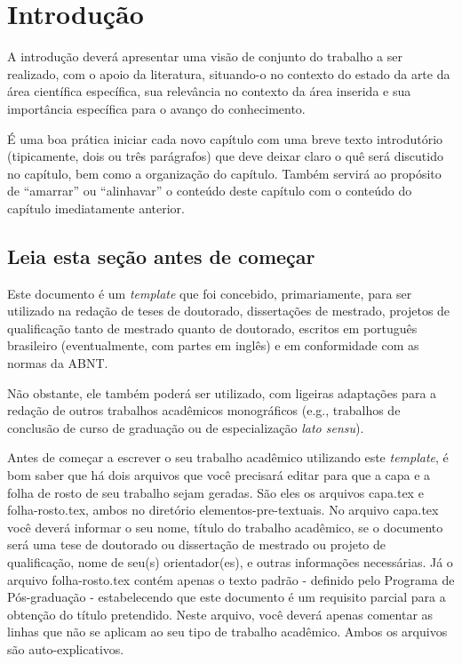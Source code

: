 
\chapter{Introdução}
\label{chap_introducao}

A introdução deverá apresentar uma visão de conjunto do trabalho a ser realizado, com o apoio da literatura, situando-o no contexto do estado da arte da área científica específica, sua relevância no contexto da área inserida e sua importância específica para o avanço do conhecimento.

É uma boa prática iniciar cada novo capítulo com uma breve texto introdutório (tipicamente, dois ou três parágrafos) que deve deixar claro o quê será discutido no capítulo, bem como a organização do capítulo.
Também servirá ao propósito de ``amarrar'' ou ``alinhavar'' o conteúdo deste capítulo com o conteúdo do capítulo imediatamente anterior.

\section{Leia esta seção antes de começar}
\label{sec_leia_esta_secao_antes_de_omecar}

Este documento é um \emph{template} que foi concebido, primariamente, para ser utilizado na redação de teses de doutorado, dissertações de mestrado, projetos de qualificação tanto de mestrado quanto de doutorado, escritos em português brasileiro (eventualmente, com partes em inglês) e em conformidade com as normas da ABNT.

Não obstante, ele também poderá ser utilizado, com ligeiras adaptações para a redação de outros trabalhos acadêmicos monográficos (e.g., trabalhos de conclusão de curso de graduação ou de especialização \emph{lato sensu}).

Antes de começar a escrever o seu trabalho acadêmico utilizando este \emph{template}, é bom saber que há dois arquivos que você precisará editar para que a capa e a folha de rosto de seu trabalho sejam geradas.
São eles os arquivos {\color{red} capa.tex} e {\color{red} folha-rosto.tex}, ambos no diretório {\color{red} elementos-pre-textuais}.
No arquivo {\color{red} capa.tex} você deverá informar o seu nome, título do trabalho acadêmico, se o documento será uma tese de doutorado ou dissertação de mestrado ou projeto de qualificação, nome de seu(s) orientador(es), e outras informações necessárias.
Já o arquivo {\color{red} folha-rosto.tex} contém apenas o texto padrão - definido pelo Programa de Pós-graduação - estabelecendo que este documento é um requisito parcial para a obtenção do título pretendido.
Neste arquivo, você deverá apenas comentar as linhas que não se aplicam ao seu tipo de trabalho acadêmico.
Ambos os arquivos são auto-explicativos.

